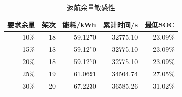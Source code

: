 \begin{table}[htbp]
\centering
\caption{返航余量敏感性}
\label{tab:q1:sensitivity}
\begin{tabular}{rrrrr}
\toprule
要求余量 & 架次 & 能耗/kWh & 累计时间/s & 最低SOC \\
\midrule
10\% & 18 & 59.1270 & 32775.10 & 23.09\% \\
15\% & 18 & 59.1270 & 32775.10 & 23.09\% \\
20\% & 18 & 59.1270 & 32775.10 & 23.09\% \\
25\% & 19 & 61.0691 & 34564.74 & 27.05\% \\
30\% & 20 & 67.2230 & 36585.26 & 31.02\% \\
\bottomrule
\end{tabular}
\end{table}
